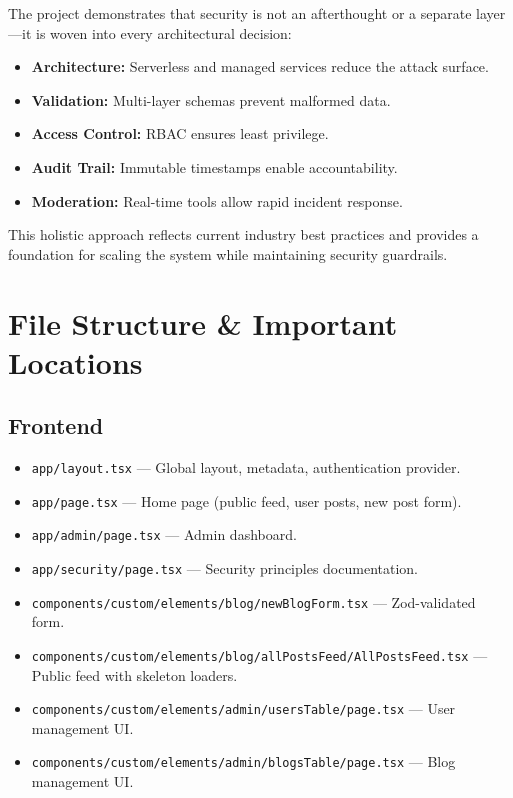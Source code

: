 \documentclass[11pt,a4paper]{article}
\begin{document}
The project demonstrates that security is not an afterthought or a separate layer—it is woven into every architectural decision:
\begin{itemize}
    \item \textbf{Architecture:} Serverless and managed services reduce the attack surface.
    \item \textbf{Validation:} Multi-layer schemas prevent malformed data.
    \item \textbf{Access Control:} RBAC ensures least privilege.
    \item \textbf{Audit Trail:} Immutable timestamps enable accountability.
    \item \textbf{Moderation:} Real-time tools allow rapid incident response.
\end{itemize}

This holistic approach reflects current industry best practices and provides a foundation for scaling the system while maintaining security guardrails.

\newpage
\appendix
\section{File Structure \& Important Locations}

\subsection{Frontend}
\begin{itemize}
    \item \texttt{app/layout.tsx} — Global layout, metadata, authentication provider.
    \item \texttt{app/page.tsx} — Home page (public feed, user posts, new post form).
    \item \texttt{app/admin/page.tsx} — Admin dashboard.
    \item \texttt{app/security/page.tsx} — Security principles documentation.
    \item \texttt{components/custom/elements/blog/newBlogForm.tsx} — Zod-validated form.
    \item \texttt{components/custom/elements/blog/allPostsFeed/AllPostsFeed.tsx} — Public feed with skeleton loaders.
    \item \texttt{components/custom/elements/admin/usersTable/page.tsx} — User management UI.
    \item \texttt{components/custom/elements/admin/blogsTable/page.tsx} — Blog management UI.
\end{itemize}
\end{document}
